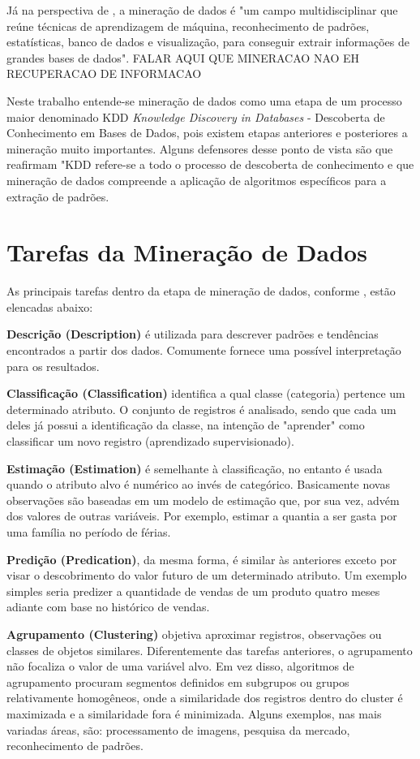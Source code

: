 \documentclass[projtg]{mdtufsm}
\begin{document}
Já na perspectiva de \cite{cabena}, a mineração de dados é "um campo multidisciplinar que reúne técnicas de aprendizagem de máquina, reconhecimento de padrões, estatísticas, banco de dados e visualização, para conseguir extrair informações de grandes bases de dados". FALAR AQUI QUE MINERACAO NAO EH RECUPERACAO DE INFORMACAO

Neste trabalho entende-se mineração de dados como uma etapa de um processo maior denominado KDD {\it Knowledge Discovery in Databases} - Descoberta de Conhecimento em Bases de Dados, pois existem etapas anteriores e posteriores a mineração muito importantes. Alguns defensores desse ponto de vista são \cite{fayyad} que reafirmam "KDD refere-se a todo o processo de descoberta de conhecimento e que mineração de dados compreende a aplicação de algoritmos específicos para a extração de padrões. 

\section{Tarefas da Mineração de Dados}

As principais tarefas dentro da etapa de mineração de dados, conforme \cite{larose2005}, estão elencadas abaixo:

\textbf{Descrição (Description)} é utilizada para descrever padrões e tendências encontrados a partir dos dados. Comumente fornece uma possível interpretação para os resultados. 

\textbf{Classificação (Classification)} identifica a qual classe (categoria) pertence um determinado atributo. O conjunto de registros é analisado, sendo que cada um deles já possui a identificação da classe, na intenção de "aprender" como classificar um novo registro (aprendizado supervisionado).

\textbf{Estimação (Estimation)} é semelhante à classificação, no entanto é usada quando o atributo alvo é numérico ao invés de categórico. Basicamente novas observações são baseadas em um modelo de estimação que, por sua vez, advém dos valores de outras variáveis. Por exemplo, estimar a quantia a ser gasta por uma família no período de férias. 

\textbf{Predição (Predication)}, da mesma forma, é similar às anteriores exceto por visar o descobrimento do valor futuro de um determinado atributo. Um exemplo simples seria predizer a quantidade de vendas de um produto quatro meses adiante com base no histórico de vendas. 

\textbf{Agrupamento (Clustering)} objetiva aproximar registros, observações ou classes de objetos similares. Diferentemente das tarefas anteriores, o agrupamento não focaliza o valor de uma variável alvo. Em vez disso, algoritmos de agrupamento procuram segmentos definidos em subgrupos ou grupos relativamente homogêneos, onde a similaridade dos registros dentro do cluster é maximizada e a similaridade fora é minimizada. Alguns exemplos, nas mais variadas áreas, são: processamento de imagens, pesquisa da mercado, reconhecimento de padrões. 
\end{document}
